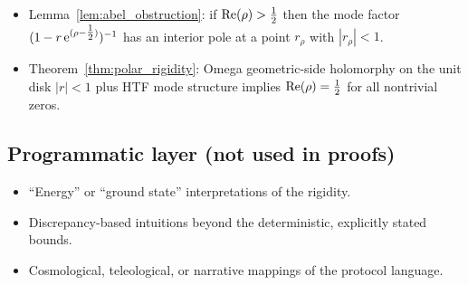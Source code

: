 \begin{itemize}
\item Lemma~\ref{lem:abel_obstruction}: if $\operatorname{Re}(\rho)>\tfrac{1}{2}$ then the mode factor $(1-r\,\mathrm{e}^{(\rho-\tfrac{1}{2})})^{-1}$ has an interior pole at a point $r_\rho$ with $|r_\rho|<1$.
\item Theorem~\ref{thm:polar_rigidity}: Omega geometric-side holomorphy on the unit disk $|r|<1$ plus HTF mode structure implies $\operatorname{Re}(\rho)=\tfrac{1}{2}$ for all nontrivial zeros.
\end{itemize}

\subsection{Programmatic layer (not used in proofs)}
\label{app:programmatic_noninputs}

\begin{itemize}
\item ``Energy'' or ``ground state'' interpretations of the rigidity.
\item Discrepancy-based intuitions beyond the deterministic, explicitly stated bounds.
\item Cosmological, teleological, or narrative mappings of the protocol language.
\end{itemize}


